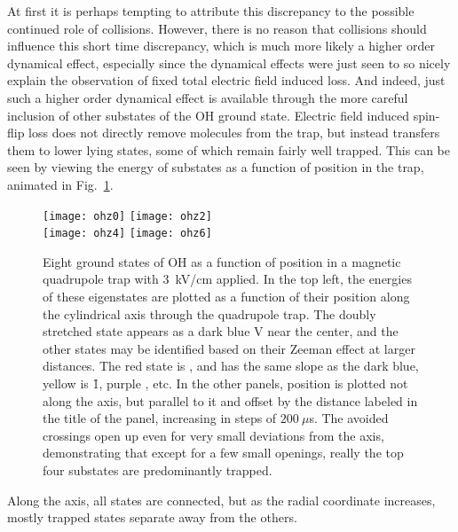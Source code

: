 
At first it is perhaps tempting to attribute this discrepancy to the possible continued role of collisions.
However, there is no reason that collisions should influence this short time discrepancy, which is much more likely a higher order dynamical effect, especially since the dynamical effects were just seen to so nicely explain the observation of fixed total electric field induced loss.
And indeed, just such a higher order dynamical effect is available through the more careful inclusion of other substates of the OH ground state.
Electric field induced spin-flip loss does not directly remove molecules from the trap, but instead transfers them to lower lying states, some of which remain fairly well trapped.
This can be seen by viewing the energy of substates as a function of position in the trap, animated in Fig.~\ref{manysubstates}.
\begin{figure}[t!]
\centering
\vspace{0.25in}
\texttt{[image: ohz0]}
\texttt{[image: ohz2]}\\
\texttt{[image: ohz4]}
\texttt{[image: ohz6]}
\caption[Partially Trapped Substates in Electric and Magnetic Fields]{
Eight ground states of OH as a function of position in a magnetic quadrupole trap with $3$~kV/cm applied.
In the top left, the energies of these eigenstates are plotted as a function of their position along the cylindrical axis through the quadrupole trap.
The doubly stretched state appears as a dark blue V near the center, and the other states may be identified based on their Zeeman effect at larger distances.
The red state is , and has the same slope as the dark blue, yellow is \f1, purple , etc.
In the other panels, position is plotted not along the axis, but parallel to it and offset by the distance labeled in the title of the panel, increasing in steps of $200~\mu$s.
The avoided crossings open up even for very small deviations from the axis, demonstrating that except for a few small openings, really the top four substates are predominantly trapped.
\label{manysubstates}}
\end{figure}
Along the axis, all states are connected, but as the radial coordinate increases, mostly trapped states separate away from the others.
